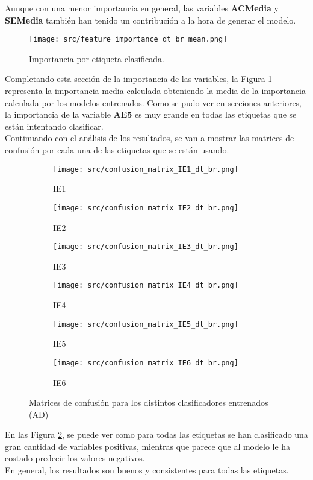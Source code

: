 Aunque con una menor importancia en general, las variables \textbf{ACMedia} y \textbf{SEMedia} también han tenido un contribución a la hora de generar el modelo.\\
\clearpage
\begin{figure}[H]
	\centering
	\texttt{[image: src/feature\_importance\_dt\_br\_mean.png]}
	\caption{Importancia por etiqueta clasificada.}
	\label{fig:dt_br_mean}
\end{figure}
Completando esta sección de la importancia de las variables, la Figura \ref{fig:dt_br_mean} representa la importancia media calculada obteniendo la media de la importancia calculada por los modelos entrenados. Como se pudo ver en secciones anteriores, la importancia de la variable \textbf{AE5} es muy grande en todas las etiquetas que se están intentando clasificar.\\
\linebreak
Continuando con el análisis de los resultados, se van a mostrar las matrices de confusión por cada una de las etiquetas que se están usando.
\begin{figure}[H]
	\centering
	\begin{subfigure}[b]{0.3\textwidth}
		\centering
		\texttt{[image: src/confusion\_matrix\_IE1\_dt\_br.png]}
		\caption{IE1}
	\end{subfigure}
	\hfill
	\begin{subfigure}[b]{0.3\textwidth}
		\centering
		\texttt{[image: src/confusion\_matrix\_IE2\_dt\_br.png]}
		\caption{IE2}
	\end{subfigure}
	\hfill
	\begin{subfigure}[b]{0.3\textwidth}
		\centering
		\texttt{[image: src/confusion\_matrix\_IE3\_dt\_br.png]}
		\caption{IE3}
	\end{subfigure}
	\hfill
	\begin{subfigure}[b]{0.3\textwidth}
		\centering
		\texttt{[image: src/confusion\_matrix\_IE4\_dt\_br.png]}
		\caption{IE4}
	\end{subfigure}
	\hfill
	\begin{subfigure}[b]{0.3\textwidth}
		\centering
		\texttt{[image: src/confusion\_matrix\_IE5\_dt\_br.png]}
		\caption{IE5}
	\end{subfigure}
	\hfill
	\begin{subfigure}[b]{0.3\textwidth}
		\centering
		\texttt{[image: src/confusion\_matrix\_IE6\_dt\_br.png]}
		\caption{IE6}
	\end{subfigure}
	\caption{Matrices de confusión para los distintos clasificadores entrenados (AD)}
	\label{fig:ml_conf_matrix_dt}
\end{figure}
En las Figura \ref{fig:ml_conf_matrix_dt}, se puede ver como para todas las etiquetas se han clasificado una gran cantidad de variables positivas, mientras que parece que al modelo le ha costado predecir los valores negativos. \\
En general, los resultados son buenos y consistentes para todas las etiquetas.
\clearpage

